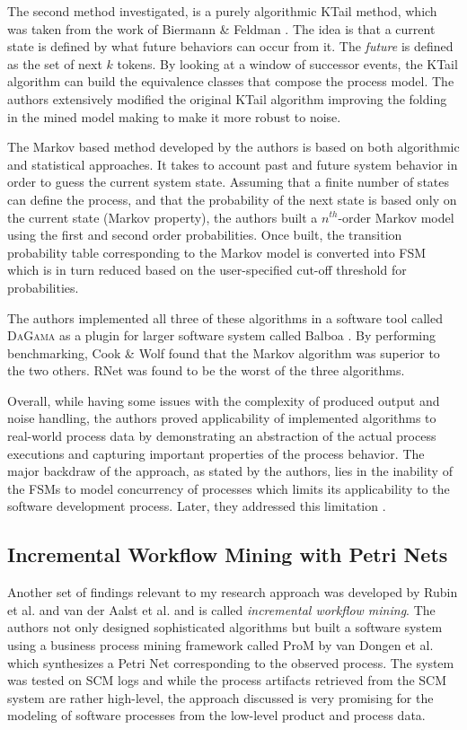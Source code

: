 The second method investigated, is a purely algorithmic KTail method, which was taken from the work of 
Biermann \& Feldman \cite{citeulike:5120603}. The idea is that a current state is defined by what future behaviors can occur 
from it. The \textit{future} is defined as the set of next $k$ tokens. By looking at a window of successor events, the KTail 
algorithm can build the equivalence classes that compose the process model. The authors extensively modified the original 
KTail algorithm improving the folding in the mined model making to make it more robust to noise.

The Markov based method developed by the authors is based on both algorithmic and statistical approaches. 
It takes to account past and future system behavior in order to guess the current system state. Assuming that a finite number 
of states can define the process, and that the probability of the next state is based only on the current state (Markov property), 
the authors built a $n^{th}$-order Markov model using the first and second order probabilities. Once built, the transition 
probability table corresponding to the Markov model is converted into FSM which is in turn reduced based on the user-specified 
cut-off threshold for probabilities.

The authors implemented all three of these algorithms in a software tool called \textsc{DaGama} as a plugin for larger software
system called Balboa \cite{citeulike:5120757}. By performing benchmarking, Cook \& Wolf found that the Markov algorithm was 
superior to the two others. RNet was found to be the worst of the three algorithms. 

Overall, while having some issues with the complexity of produced output and noise handling, the authors proved applicability 
of implemented algorithms to real-world process data by demonstrating an abstraction of the actual process executions and 
capturing important properties of the process behavior. The major backdraw of the approach, as stated by the authors, 
lies in the inability of the FSMs to model concurrency of processes which limits its applicability to the software development process.
Later, they addressed this limitation \cite{citeulike:5128143}.


\subsection{Incremental Workflow Mining with Petri Nets}
Another set of findings relevant to my research approach was developed by Rubin
et al. \cite{citeulike:1885717} and van der Aalst et al.
\cite{citeulike:3718014} and is called \textit{incremental workflow mining}. The
authors not only designed sophisticated algorithms but built a software system
using a business process mining framework called ProM by van Dongen et al.
\cite{citeulike:5043673} which synthesizes a Petri Net corresponding to the
observed process. The system was tested on SCM logs and while the process
artifacts retrieved from the SCM system are rather high-level, the approach
discussed is very promising for the modeling of software processes from the
low-level product and process data.


